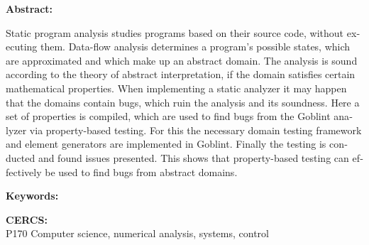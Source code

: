 \documentclass[../thesis.tex]{subfiles}
\begin{document}
\vspace*{5ex}

\begin{otherlanguage}{english}

\noindent\textbf{\large \mytitle}

\vspace*{1ex}

\noindent\textbf{Abstract:}

\noindent
Static program analysis studies programs based on their source code, without executing them.
Data-flow analysis determines a program's possible states, which are approximated and which make up an abstract domain. The analysis is sound according to the theory of abstract interpretation, if the domain satisfies certain mathematical properties.
When implementing a static analyzer it may happen that the domains contain bugs, which ruin the analysis and its soundness.
Here a set of properties is compiled, which are used to find bugs from the Goblint analyzer via property-based testing.
For this the necessary domain testing framework and element generators are implemented in Goblint. Finally the testing is conducted and found issues presented.
This shows that property-based testing can effectively be used to find bugs from abstract domains.

\vspace*{1ex}

\noindent\textbf{Keywords:}\\
\mykeywords

\vspace*{1ex}

\noindent\textbf{CERCS:}\\
P170 Computer science, numerical analysis, systems, control

\vspace*{1ex}

\end{otherlanguage} %
\end{document}
